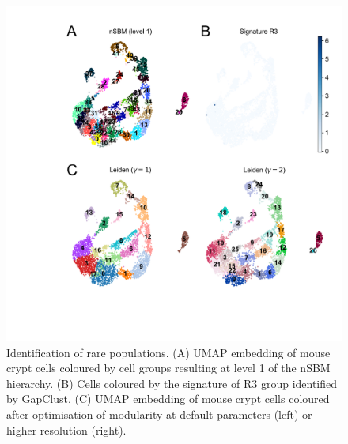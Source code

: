 \documentclass[11pt, titlepage, twoside]{article}
\begin{document}
\clearpage
\begin{figure}[H]
\centering
\includegraphics[keepaspectratio,width=1\textwidth,height=\textheight]{Figure_Rare_Cells_Supp.pdf}
\caption[]{Identification of rare populations. (A) UMAP embedding of mouse crypt cells coloured by cell groups resulting at level 1 of the nSBM hierarchy. (B) Cells coloured by the signature of R3 group identified by GapClust. (C) UMAP embedding of mouse crypt cells coloured after optimisation of modularity at default parameters (left) or higher resolution (right).} \label{Figure_Rare_Supp}
\end{figure}
\end{document}
